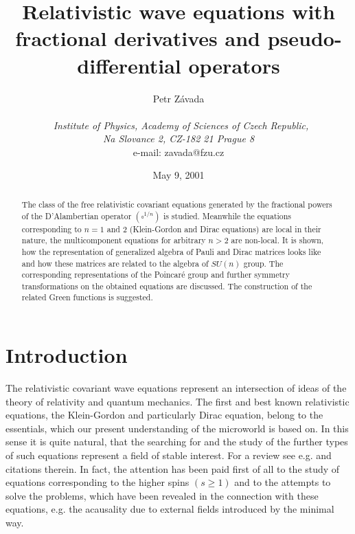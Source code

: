 \documentclass[a4paper,a4paper]{article}
\begin{document}
\author{Petr Z\'avada \\
\\
\ \textit{Institute of Physics, Academy of Sciences of Czech Republic,}\\
\textit{Na Slovance 2, CZ-182 21 Prague 8}\\
e-mail: zavada@fzu.cz}
\date{May 9, 2001}
\title{Relativistic wave equations with fractional derivatives and
pseudo-differential operators}
\maketitle

\begin{abstract}
The class of the free relativistic covariant equations generated by the
fractional powers of the D'Alambertian operator $(\square ^{1/n})$ is studied.
Meanwhile the equations corresponding to $n=1$ and $2$ (Klein-Gordon and
Dirac equations) are local in their nature, the multicomponent equations for
arbitrary $n>2$ are non-local. It is shown, how the representation of
generalized algebra of Pauli and Dirac matrices looks like and how these
matrices are related to the algebra of $SU(n)$ group. The corresponding
representations of the Poincar\'e group and further symmetry transformations
on the obtained equations are discussed. The construction of the related
Green functions is suggested.
\end{abstract}


\section{Introduction}

The relativistic covariant wave equations represent an intersection of ideas
of the theory of relativity and quantum mechanics. The first and best known
relativistic equations, the Klein-Gordon and particularly Dirac equation,
belong to the essentials, which our present understanding of the microworld
is based on. In this sense it is quite natural, that the searching for and
the study of the further types of such equations represent a field of stable
interest. For a review see e.g. \cite{rev} and citations therein. In fact,
the attention has been paid first of all to the study of equations
corresponding to the higher spins $(s\geq 1)$ and to the attempts to solve
the problems, which have been revealed in the connection with these
equations, e.g. the acausality due to external fields introduced by the
minimal way.
\end{document}
